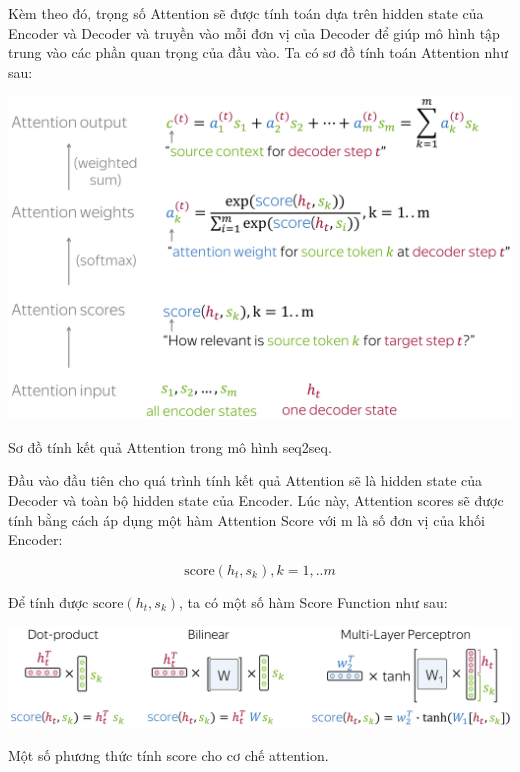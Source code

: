 \documentclass[a4paper, 12pt, openany]{book}
\begin{document}
Kèm theo đó, trọng số Attention sẽ được tính toán dựa trên hidden state của Encoder và Decoder và 
truyền vào mỗi đơn vị của Decoder để giúp mô hình tập trung vào các phần quan trọng của đầu vào. Ta có sơ đồ tính toán Attention như sau:

\begin{minipage}{\linewidth}
    \captionsetup{type=figure}
    \centering
    \includegraphics[width=\linewidth]{./assets/images/computation_scheme-min.png}
    \caption{Sơ đồ tính kết quả Attention trong mô hình \ac{seq2seq}.}
\end{minipage}
\vspace{0.5cm}

Đầu vào đầu tiên cho quá trình tính kết quả Attention sẽ là hidden state của Decoder và toàn bộ hidden state của Encoder.
Lúc này, Attention scores sẽ được tính bằng cách áp dụng một hàm Attention Score với m là số đơn vị của khối Encoder:
\begin{center}
    \begin{equation}
        \text{score}(h_t, s_k), k=1,..m
    \end{equation}
\end{center}
\vspace{0.5cm}

Để tính được \( \text{score}(h_t, s_k) \), ta có một số hàm Score Function như sau:

\begin{minipage}{\linewidth}
    \captionsetup{type=figure}
    \centering
    \includegraphics[width=\linewidth]{./assets/images/score_functions-min.png}
    \caption{Một số phương thức tính score cho cơ chế attention.}
\end{minipage}
\vspace{0.5cm}
\end{document}
